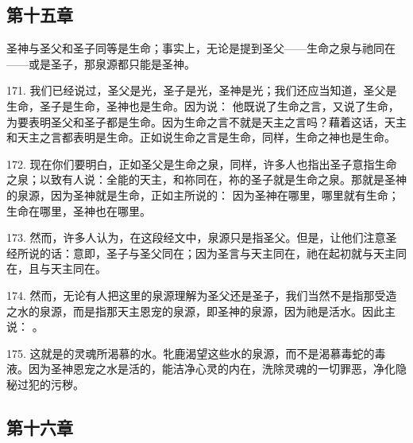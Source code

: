 
\subsection{第十五章}

圣神与圣父和圣子同等是生命；事实上，无论是提到圣父——生命之泉与祂同在——或是圣子，那泉源都只能是圣神。\par

171. 我们已经说过，圣父是光，圣子是光，圣神是光；我们还应当知道，圣父是生命，圣子是生命，圣神也是生命。因为说：  他既说了生命之言，又说了生命，为要表明圣父和圣子都是生命。因为生命之言不就是天主之言吗？藉着这话，天主和天主之言都表明是生命。正如说生命之言是生命，同样，生命之神也是生命。\par

172. 现在你们要明白，正如圣父是生命之泉，同样，许多人也指出圣子意指生命之泉；以致有人说：全能的天主，和祢同在，祢的圣子就是生命之泉。那就是圣神的泉源，因为圣神就是生命，正如主所说的：  因为圣神在哪里，哪里就有生命；生命在哪里，圣神也在哪里。\par

173. 然而，许多人认为，在这段经文中，泉源只是指圣父。但是，让他们注意圣经所说的话：意即，圣子与圣父同在；因为圣言与天主同在，祂在起初就与天主同在，且与天主同在。\par

174. 然而，无论有人把这里的泉源理解为圣父还是圣子，我们当然不是指那受造之水的泉源，而是指那天主恩宠的泉源，即圣神的泉源，因为祂是活水。因此主说： 。\par

175. 这就是的灵魂所渴慕的水。牝鹿渴望这些水的泉源，而不是渴慕毒蛇的毒液。因为圣神恩宠之水是活的，能洁净心灵的内在，洗除灵魂的一切罪恶，净化隐秘过犯的污秽。\par


\subsection{第十六章}

